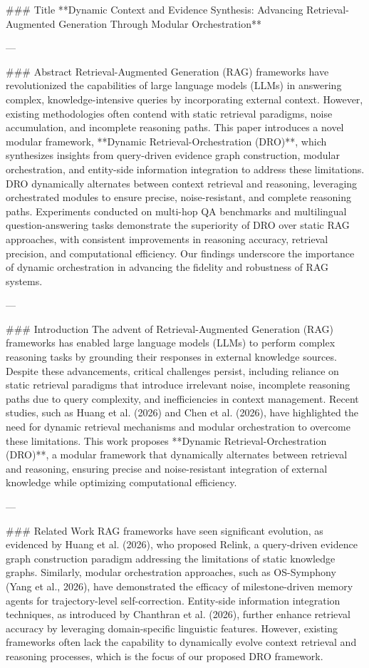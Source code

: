 ### Title  
**Dynamic Context and Evidence Synthesis: Advancing Retrieval-Augmented Generation Through Modular Orchestration**

---

### Abstract  
Retrieval-Augmented Generation (RAG) frameworks have revolutionized the capabilities of large language models (LLMs) in answering complex, knowledge-intensive queries by incorporating external context. However, existing methodologies often contend with static retrieval paradigms, noise accumulation, and incomplete reasoning paths. This paper introduces a novel modular framework, **Dynamic Retrieval-Orchestration (DRO)**, which synthesizes insights from query-driven evidence graph construction, modular orchestration, and entity-side information integration to address these limitations. DRO dynamically alternates between context retrieval and reasoning, leveraging orchestrated modules to ensure precise, noise-resistant, and complete reasoning paths. Experiments conducted on multi-hop QA benchmarks and multilingual question-answering tasks demonstrate the superiority of DRO over static RAG approaches, with consistent improvements in reasoning accuracy, retrieval precision, and computational efficiency. Our findings underscore the importance of dynamic orchestration in advancing the fidelity and robustness of RAG systems.

---

### Introduction  
The advent of Retrieval-Augmented Generation (RAG) frameworks has enabled large language models (LLMs) to perform complex reasoning tasks by grounding their responses in external knowledge sources. Despite these advancements, critical challenges persist, including reliance on static retrieval paradigms that introduce irrelevant noise, incomplete reasoning paths due to query complexity, and inefficiencies in context management. Recent studies, such as Huang et al. (2026) and Chen et al. (2026), have highlighted the need for dynamic retrieval mechanisms and modular orchestration to overcome these limitations. This work proposes **Dynamic Retrieval-Orchestration (DRO)**, a modular framework that dynamically alternates between retrieval and reasoning, ensuring precise and noise-resistant integration of external knowledge while optimizing computational efficiency.

---

### Related Work  
RAG frameworks have seen significant evolution, as evidenced by Huang et al. (2026), who proposed Relink, a query-driven evidence graph construction paradigm addressing the limitations of static knowledge graphs. Similarly, modular orchestration approaches, such as OS-Symphony (Yang et al., 2026), have demonstrated the efficacy of milestone-driven memory agents for trajectory-level self-correction. Entity-side information integration techniques, as introduced by Chanthran et al. (2026), further enhance retrieval accuracy by leveraging domain-specific linguistic features. However, existing frameworks often lack the capability to dynamically evolve context retrieval and reasoning processes, which is the focus of our proposed DRO framework.

